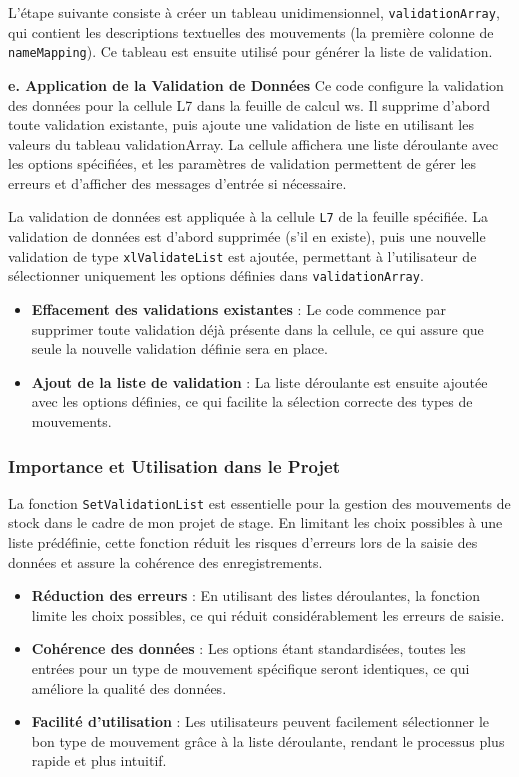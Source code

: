 \documentclass[a4paper, oneside, 12pt, final]{extreport}
\begin{document}
L'étape suivante consiste à créer un tableau unidimensionnel, \texttt{validationArray}, qui contient les descriptions textuelles des mouvements (la première colonne de \texttt{nameMapping}). Ce tableau est ensuite utilisé pour générer la liste de validation.

\textbf{e. Application de la Validation de Données}
Ce code configure la validation des données pour la cellule L7 dans la feuille de calcul ws. Il supprime d'abord toute validation existante, puis ajoute une validation de liste en utilisant les valeurs du tableau validationArray. La cellule affichera une liste déroulante avec les options spécifiées, et les paramètres de validation permettent de gérer les erreurs et d'afficher des messages d'entrée si nécessaire.

La validation de données est appliquée à la cellule \texttt{L7} de la feuille spécifiée. La validation de données est d'abord supprimée (s'il en existe), puis une nouvelle validation de type \texttt{xlValidateList} est ajoutée, permettant à l'utilisateur de sélectionner uniquement les options définies dans \texttt{validationArray}.

\begin{itemize}
    \item \textbf{Effacement des validations existantes} : Le code commence par supprimer toute validation déjà présente dans la cellule, ce qui assure que seule la nouvelle validation définie sera en place.
    \item \textbf{Ajout de la liste de validation} : La liste déroulante est ensuite ajoutée avec les options définies, ce qui facilite la sélection correcte des types de mouvements.
\end{itemize}

\subsubsection{Importance et Utilisation dans le Projet}
La fonction \texttt{SetValidationList} est essentielle pour la gestion des mouvements de stock dans le cadre de mon projet de stage. En limitant les choix possibles à une liste prédéfinie, cette fonction réduit les risques d'erreurs lors de la saisie des données et assure la cohérence des enregistrements.

\begin{itemize}
    \item \textbf{Réduction des erreurs} : En utilisant des listes déroulantes, la fonction limite les choix possibles, ce qui réduit considérablement les erreurs de saisie.
    \item \textbf{Cohérence des données} : Les options étant standardisées, toutes les entrées pour un type de mouvement spécifique seront identiques, ce qui améliore la qualité des données.
    \item \textbf{Facilité d'utilisation} : Les utilisateurs peuvent facilement sélectionner le bon type de mouvement grâce à la liste déroulante, rendant le processus plus rapide et plus intuitif.
\end{itemize}
\end{document}
